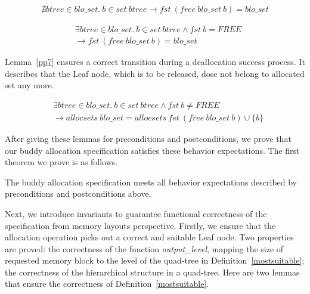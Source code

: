 \begin{lemma} 
\label{pp5}
\end{lemma}
\vspace{-7pt}
{\footnotesize
\begin{align*}
\nexists btree \in blo\_set.\ b \in set\ btree \longrightarrow fst\ (free\ blo\_set\ b) = blo\_set
\end{align*}
}
\vspace{-12pt}
	
\begin{lemma} 
\label{pp6}
\end{lemma}
\vspace{-7pt}
{\footnotesize
\begin{align*}
&\exists btree \in blo\_set.\ b \in set\ btree \wedge fst\ b = FREE \\
&\longrightarrow fst\ (free\ blo\_set\ b) = blo\_set
\end{align*}
}
\vspace{-12pt}

Lemma~\ref{pp7} ensures a correct transition during a deallocation success process. It describes that the Leaf node, which is to be released, dose not belong to allocated set any more.

\begin{lemma} 
\label{pp7}
\end{lemma}
\vspace{-7pt}
{\footnotesize
\begin{align*}
&\exists btree \in blo\_set.\ b \in set\ btree \wedge fst\ b \neq FREE \\ &\longrightarrow allocsets\ blo\_set = allocsets\ fst\ (free\ blo\_set\ b) \cup \lbrace b \rbrace
\end{align*}
}
\vspace{-12pt}

After giving these lemmas for preconditions and postconditions, we prove that our buddy allocation specification satisfies these behavior expectations. The first theorem we prove is as follows.

\begin{theorem}
The buddy allocation specification meets all behavior expectations described by preconditions and postconditions above.
\end{theorem}

Next, we introduce invariants to guarantee functional correctness of the specification from memory layouts perspective. Firstly, we ensure that the allocation operation picks out a correct and suitable Leaf node. Two properties are proved: the correctness of the function \emph{output\_level}, mapping the size of requested memory block to the level of the quad-tree in Definition~\ref{mostsuitable}; the correctness of the hierarchical structure in a quad-tree. Here are two lemmas that ensure the correctness of Definition~\ref{mostsuitable}.

